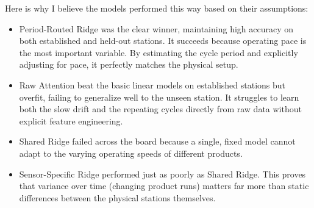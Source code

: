 \documentclass[11pt, a4paper]{article}
\begin{document}
\begin{table}[H]
\centering
{}
\caption{Validation performance across forecasting models.}
\end{table}

Here is why I believe the models performed this way based on their assumptions:

\begin{itemize}
  \item Period-Routed Ridge was the clear winner, maintaining high accuracy on both established and held-out stations. It succeeds because operating pace is the most important variable. By estimating the cycle period and explicitly adjusting for pace, it perfectly matches the physical setup.
  \item Raw Attention beat the basic linear models on established stations but overfit, failing to generalize well to the unseen station. It struggles to learn both the slow drift and the repeating cycles directly from raw data without explicit feature engineering.
  \item Shared Ridge failed across the board because a single, fixed model cannot adapt to the varying operating speeds of different products.
  \item Sensor-Specific Ridge performed just as poorly as Shared Ridge. This proves that variance over time (changing product runs) matters far more than static differences between the physical stations themselves.
\end{itemize}
\end{document}
